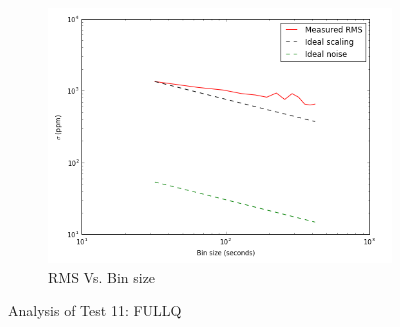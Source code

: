 \documentclass{aastex6}
\begin{document}
\begin{figure}[H]
    \begin{subfigure}{3}
        \includegraphics[scale=0.6]{rms_test11}
        \caption{RMS Vs. Bin size}
    \end{subfigure}
    \caption{Analysis of Test 11: FULLQ}
\end{figure}
\end{document}
